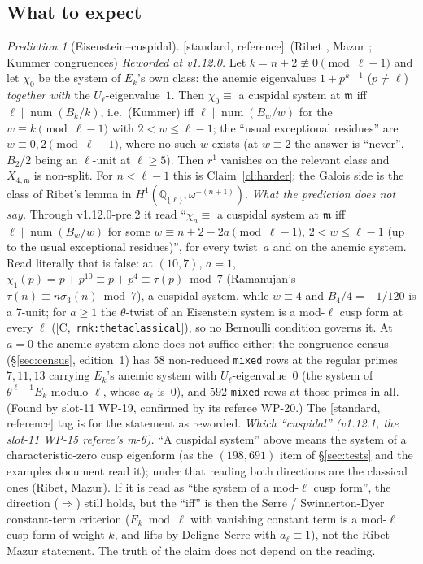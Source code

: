 \documentclass[11pt]{article}
\theoremstyle{remark}
\newtheorem{prediction}[theorem]{Prediction}
\newcommand{\Q}{\mathbb{Q}}
\DeclareMathOperator{\num}{num}
\newcommand{\m}{\mathfrak{m}}
\newcommand{\HA}[1]{[C,~\texttt{#1}]}      %
\newcommand{\STD}{\textsf{[standard, reference]}}
\begin{document}
\subsection{What to expect}\label{sec:expect}
\begin{prediction}[Eisenstein--cuspidal]\label{pr:eiscusp}\STD\ (Ribet \cite{ribet}, Mazur \cite{mazur}; Kummer congruences)
\emph{Reworded at v1.12.0.} Let $k=n+2\not\equiv0\pmod{\ell-1}$ and let $\chi_0$ be the system of $E_k$'s
own class: the anemic eigenvalues $1+p^{k-1}$ ($p\ne\ell$) \emph{together with} the
$U_\ell$-eigenvalue~$1$. Then $\chi_0\equiv$ a cuspidal system at $\m$ iff $\ell\mid\num(B_k/k)$, i.e.\
(Kummer) iff $\ell\mid\num(B_w/w)$ for the $w\equiv k\pmod{\ell-1}$ with $2<w\le\ell-1$; the ``usual
exceptional residues'' are $w\equiv0,2\pmod{\ell-1}$, where no such $w$ exists (at $w\equiv2$ the answer
is ``never'', $B_2/2$ being an $\ell$-unit at $\ell\ge5$). Then $r^1$ vanishes on the relevant class and
$X_{4,\m}$ is non-split. For $n<\ell-1$ this is Claim~\ref{cl:harder}; the Galois side is the class of
Ribet's lemma in $H^1(\Q_{\{\ell\}},\omega^{-(n+1)})$. \emph{What the prediction does not say.} Through
v1.12.0-pre.2 it read ``$\chi_a\equiv$ a cuspidal system at $\m$ iff $\ell\mid\num(B_w/w)$ for some
$w\equiv n+2-2a\pmod{\ell-1}$, $2<w\le\ell-1$ (up to the usual exceptional residues)'', for every
twist~$a$ and on the anemic system. Read literally that is false: at $(10,7)$, $a=1$,
$\chi_1(p)=p+p^{10}\equiv p+p^{4}\equiv\tau(p)\bmod7$ (Ramanujan's $\tau(n)\equiv n\sigma_3(n)\bmod7$), a
cuspidal system, while $w\equiv4$ and $B_4/4=-1/120$ is a $7$-unit; for $a\ge1$ the $\theta$-twist of an
Eisenstein system is a mod-$\ell$ cusp form at every $\ell$ (\HA{rmk:thetaclassical}), so no Bernoulli
condition governs it. At $a=0$ the anemic system alone does not suffice either: the congruence census
(\S\ref{sec:census}, edition~1) has $58$ non-reduced \texttt{mixed} rows at the regular primes
$7,11,13$ carrying $E_k$'s anemic system with $U_\ell$-eigenvalue~$0$ (the system of $\theta^{\ell-1}E_k$ modulo $\ell$, whose $a_\ell$
is~$0$), and $592$ \texttt{mixed} rows at those primes in all. (Found by slot-11 WP-19, confirmed by
its referee WP-20.) The \STD{} tag is for the statement as reworded.
\emph{Which ``cuspidal'' (v1.12.1, the slot-11 WP-15 referee's m-6).} ``A cuspidal system'' above means
the system of a characteristic-zero cusp eigenform (as the $(198,691)$ item of \S\ref{sec:tests} and the
examples document read it); under that reading both directions are the classical ones (Ribet, Mazur).
If it is read as ``the system of a mod-$\ell$ cusp form'', the direction ($\Rightarrow$) still holds, but
the ``iff'' is then the Serre / Swinnerton-Dyer constant-term criterion ($E_k\bmod\ell$ with vanishing
constant term is a mod-$\ell$ cusp form of weight $k$, and lifts by Deligne--Serre with $a_\ell\equiv1$),
not the Ribet--Mazur statement. The truth of the claim does not depend on the reading.
\end{prediction}
\end{document}
